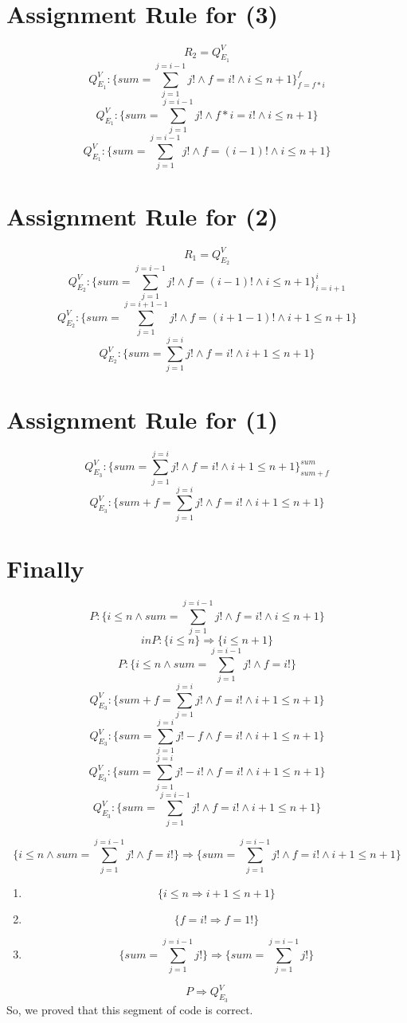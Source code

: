 \documentclass{assignment}
\begin{document}
\section*{Assignment Rule for (3)}
    \[R_2 = Q_{E_1}^V\]
    \[Q_{E_1}^V: \{sum = \sum_{j=1}^{j=i-1}j! \wedge f = i! \wedge i \leq n + 1\}_{f=f*i}^f\]
    \[Q_{E_1}^V: \{sum = \sum_{j=1}^{j=i-1}j! \wedge f*i = i! \wedge i \leq n + 1\}\]
    \[Q_{E_1}^V: \{sum = \sum_{j=1}^{j=i-1}j! \wedge f = (i-1)! \wedge i \leq n + 1\}\]
\section*{Assignment Rule for (2)}
    \[R_1 = Q_{E_2}^V\]
    \[Q_{E_2}^V: \{sum = \sum_{j=1}^{j=i-1}j! \wedge f = (i-1)! \wedge i \leq n + 1\}_{i = i + 1}^{i}\]
    \[Q_{E_2}^V: \{sum = \sum_{j=1}^{j=i+1-1}j! \wedge f = (i + 1 -1)! \wedge i+1 \leq n +1\}\]
    \[Q_{E_2}^V: \{sum = \sum_{j=1}^{j=i}j! \wedge f = i! \wedge i+1 \leq n +1\}\]
\section*{Assignment Rule for (1)}
    \[Q_{E_3}^V: \{sum = \sum_{j=1}^{j=i}j! \wedge f = i! \wedge i+1 \leq n +1\}_{sum+f}^{sum}\]
    \[Q_{E_3}^V: \{sum + f = \sum_{j=1}^{j=i}j! \wedge f = i! \wedge i+1 \leq n +1\}\] 

\section*{Finally}
\[P: \{i \leq n \wedge sum = \sum_{j=1}^{j=i-1} j! \wedge f = i! \wedge i \leq n + 1\}\]
\[in P: \{i \leq n\} \Rightarrow \{i \leq n+1\}\]
\[P: \{i \leq n \wedge sum = \sum_{j=1}^{j=i-1} j! \wedge f = i! \}\]
\[Q_{E_3}^V: \{sum + f = \sum_{j=1}^{j=i}j! \wedge f = i! \wedge i+1 \leq n +1\}\]
\[Q_{E_3}^V: \{sum = \sum_{j=1}^{j=i} j! - f \wedge f = i! \wedge i+1 \leq n +1\}\]
\[Q_{E_3}^V: \{sum = \sum_{j=1}^{j=i} j! - i! \wedge f = i! \wedge i+1 \leq n +1\}\]
\[Q_{E_3}^V: \{sum = \sum_{j=1}^{j=i-1} j! \wedge f = i! \wedge i+1 \leq n +1\}\]

\[\{i \leq n \wedge sum = \sum_{j=1}^{j=i-1} j! \wedge f = i! \} \Rightarrow \{sum = \sum_{j=1}^{j=i-1} j! \wedge f = i! \wedge i+1 \leq n +1\} \]
\begin{enumerate}
    \item
        \[\{i \leq n \Rightarrow i + 1 \leq n+1\}\]
    \item
        \[\{f = i! \Rightarrow f = 1!\}\]
    \item 
        \[\{sum = \sum_{j=1}^{j=i-1} j!\} \Rightarrow \{sum = \sum_{j=1}^{j=i-1} j!\}\]
\end{enumerate}
\[P \Rightarrow Q_{E_3}^V\]
So, we proved that this segment of code is correct.
\end{document}
